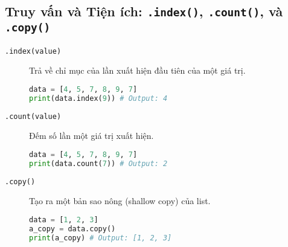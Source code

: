 \documentclass[11pt]{article}
\begin{document}
\subsection{Truy vấn và Tiện ích: \texttt{.index()}, \texttt{.count()}, và \texttt{.copy()}}
\begin{description}
    \item[\texttt{.index(value)}] Trả về chỉ mục của lần xuất hiện đầu tiên của một giá trị.
    \begin{lstlisting}[language=Python]
data = [4, 5, 7, 8, 9, 7]
print(data.index(9)) # Output: 4
    \end{lstlisting}
    \item[\texttt{.count(value)}] Đếm số lần một giá trị xuất hiện.
    \begin{lstlisting}[language=Python]
data = [4, 5, 7, 8, 9, 7]
print(data.count(7)) # Output: 2
    \end{lstlisting}
    \item[\texttt{.copy()}] Tạo ra một bản sao nông (shallow copy) của list.
    \begin{lstlisting}[language=Python]
data = [1, 2, 3]
a_copy = data.copy()
print(a_copy) # Output: [1, 2, 3]
    \end{lstlisting}
\end{description}
\end{document}

